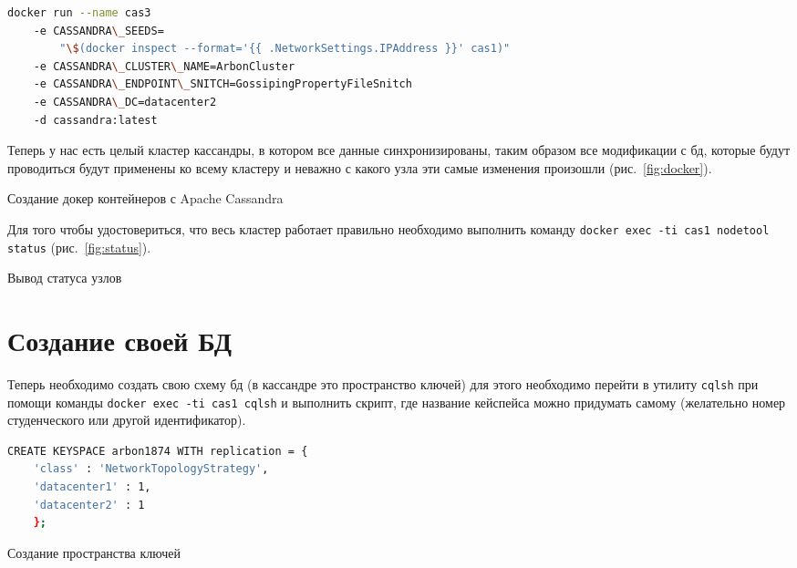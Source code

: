 \begin{lstlisting}[language=bash]
docker run --name cas3
	-e CASSANDRA\_SEEDS=
		"\$(docker inspect --format='{{ .NetworkSettings.IPAddress }}' cas1)"
	-e CASSANDRA\_CLUSTER\_NAME=ArbonCluster
	-e CASSANDRA\_ENDPOINT\_SNITCH=GossipingPropertyFileSnitch
	-e CASSANDRA\_DC=datacenter2
	-d cassandra:latest
\end{lstlisting}

Теперь у нас есть целый кластер кассандры, в котором все данные
синхронизированы, таким образом все модификации с бд, которые
будут проводиться будут применены ко всему кластеру и неважно с
какого узла эти самые изменения произошли (рис.~\ref{fig:docker}).

\begin{image}
	\caption{Создание докер контейнеров с Apache Cassandra}
	\label{fig:docker}
\end{image}

Для того чтобы удостовериться, что весь кластер работает правильно
необходимо выполнить команду \texttt{docker exec -ti cas1 nodetool status}
(рис.~\ref{fig:status}).

\begin{image}
	\caption{Вывод статуса узлов}
	\label{fig:status}
\end{image}

\section{Создание своей БД}

Теперь необходимо создать свою схему бд (в кассандре это
пространство ключей) для этого необходимо перейти в утилиту \texttt{cqlsh} 
при помощи команды \texttt{docker exec -ti cas1 cqlsh} и выполнить скрипт,
где название кейспейса можно придумать самому (желательно номер
студенческого или другой идентификатор).

\begin{lstlisting}[language=bash]
CREATE KEYSPACE arbon1874 WITH replication = {
	'class' : 'NetworkTopologyStrategy',
	'datacenter1' : 1,
	'datacenter2' : 1
	};
\end{lstlisting}

\begin{image}
	\caption{Создание пространства ключей}
	\label{fig:keyspace}
\end{image}

